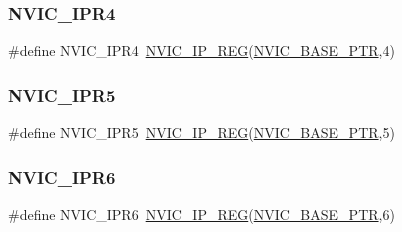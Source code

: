 \subsubsection{\texorpdfstring{N\+V\+I\+C\+\_\+\+I\+P\+R4}{NVIC\_IPR4}}
{\footnotesize\ttfamily \#define N\+V\+I\+C\+\_\+\+I\+P\+R4~\hyperlink{group___n_v_i_c___register___accessor___macros_gab650200327187b4594896adc6e6e1d53}{N\+V\+I\+C\+\_\+\+I\+P\+\_\+\+R\+EG}(\hyperlink{group___n_v_i_c___peripheral_ga28f0a055d0c218e16d1fc7b13ff0caa5}{N\+V\+I\+C\+\_\+\+B\+A\+S\+E\+\_\+\+P\+TR},4)}

\mbox{\label{group___n_v_i_c___register___accessor___macros_ga86802cec04cf0988062781f67bcaad9a}} 
\subsubsection{\texorpdfstring{N\+V\+I\+C\+\_\+\+I\+P\+R5}{NVIC\_IPR5}}
{\footnotesize\ttfamily \#define N\+V\+I\+C\+\_\+\+I\+P\+R5~\hyperlink{group___n_v_i_c___register___accessor___macros_gab650200327187b4594896adc6e6e1d53}{N\+V\+I\+C\+\_\+\+I\+P\+\_\+\+R\+EG}(\hyperlink{group___n_v_i_c___peripheral_ga28f0a055d0c218e16d1fc7b13ff0caa5}{N\+V\+I\+C\+\_\+\+B\+A\+S\+E\+\_\+\+P\+TR},5)}

\mbox{\label{group___n_v_i_c___register___accessor___macros_ga0986846cc9f1bf5c816ec885eda9aed8}} 
\subsubsection{\texorpdfstring{N\+V\+I\+C\+\_\+\+I\+P\+R6}{NVIC\_IPR6}}
{\footnotesize\ttfamily \#define N\+V\+I\+C\+\_\+\+I\+P\+R6~\hyperlink{group___n_v_i_c___register___accessor___macros_gab650200327187b4594896adc6e6e1d53}{N\+V\+I\+C\+\_\+\+I\+P\+\_\+\+R\+EG}(\hyperlink{group___n_v_i_c___peripheral_ga28f0a055d0c218e16d1fc7b13ff0caa5}{N\+V\+I\+C\+\_\+\+B\+A\+S\+E\+\_\+\+P\+TR},6)}

